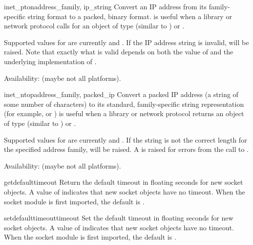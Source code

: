 \begin{funcdesc}{inet_pton}{address_family, ip_string}
Convert an IP address from its family-specific string format to a packed,
binary format.
 is useful when a library or network protocol calls for
an object of type  (similar to )
or .

Supported values for  are currently
 and .
If the IP address string  is invalid,
 will be raised. Note that exactly what is valid
depends on both the value of  and the underlying
implementation of .

Availability: \UNIX{} (maybe not all platforms).
\end{funcdesc}

\begin{funcdesc}{inet_ntop}{address_family, packed_ip}
Convert a packed IP address (a string of some number of characters) to
its standard, family-specific string representation (for example,
 or )
 is useful when a library or network protocol returns
an object of type  (similar to )
or .

Supported values for  are currently
 and .
If the string  is not the correct length for the
specified address family,  will be raised.  A
 is raised for errors from the call to
.

Availability: \UNIX{} (maybe not all platforms).
\end{funcdesc}

\begin{funcdesc}{getdefaulttimeout}{}
Return the default timeout in floating seconds for new socket objects.
A value of  indicates that new socket objects have no timeout.
When the socket module is first imported, the default is .
\end{funcdesc}

\begin{funcdesc}{setdefaulttimeout}{timeout}
Set the default timeout in floating seconds for new socket objects.
A value of  indicates that new socket objects have no timeout.
When the socket module is first imported, the default is .
\end{funcdesc}

